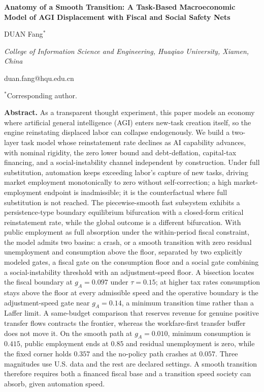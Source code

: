 \documentclass[11pt]{article}
\begin{document}
\begin{center}
{\large\bfseries Anatomy of a Smooth Transition: A Task-Based Macroeconomic
Model of AGI Displacement with Fiscal and Social Safety Nets}

\vspace{0.8em}

DUAN Fang$^{*}$

\vspace{0.4em}

\emph{College of Information Science and Engineering, Huaqiao University,
Xiamen, China}

\vspace{0.2em}

{\small duan.fang@hqu.edu.cn}

\vspace{0.3em}

{\small $^{*}$Corresponding author.}
\end{center}

\vspace{0.6em}

\noindent\textbf{Abstract.}
As a transparent thought experiment, this paper models an economy where
artificial general intelligence (AGI) enters new-task creation itself, so the
engine reinstating displaced labor can collapse endogenously. We build a
two-layer task model whose reinstatement rate declines as AI capability
advances, with nominal rigidity, the zero lower bound and debt-deflation,
capital-tax financing, and a social-instability channel independent by
construction. Under full substitution, automation keeps exceeding labor's
capture of new tasks, driving market employment monotonically to zero without
self-correction; a high market-employment endpoint is inadmissible; it is the
counterfactual where full substitution is not reached. The piecewise-smooth
fast subsystem exhibits a persistence-type boundary equilibrium bifurcation
with a closed-form critical reinstatement rate, while the global outcome is a
different bifurcation. With public employment as full absorption under the
within-period fiscal constraint, the model admits two basins: a crash, or a
smooth transition with zero residual unemployment and consumption above the
floor, separated by two explicitly modeled gates, a fiscal gate on the
consumption floor and a social gate combining a social-instability threshold
with an adjustment-speed floor. A bisection locates the fiscal boundary at
$g_A=0.097$ under $\tau=0.15$; at higher tax rates consumption stays above the
floor at every admissible speed and the operative boundary is the
adjustment-speed gate near $g_A=0.14$, a minimum transition time rather than a
Laffer limit. A same-budget comparison that reserves revenue for genuine
positive transfer flows contracts the frontier, whereas the workfare-first
transfer buffer does not move it. On the smooth path at $g_A=0.010$, minimum
consumption is $0.415$, public employment ends at $0.85$ and residual
unemployment is zero, while the fixed corner holds $0.357$ and the no-policy
path crashes at $0.057$. Three magnitudes use U.S. data and the rest are
declared settings. A smooth transition therefore requires both a financed
fiscal base and a transition speed society can absorb, given automation speed.
\end{document}
